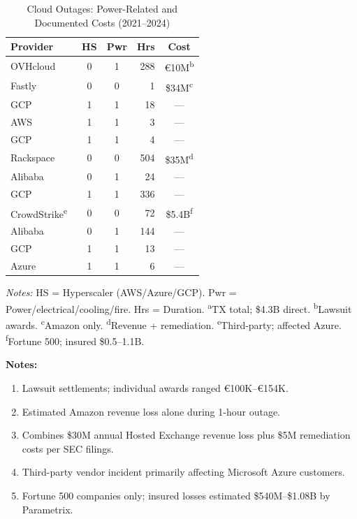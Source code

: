 \documentclass[sigconf]{acmart}
\begin{document}
\begin{table}[t]
\centering
\scriptsize
\caption{Cloud Outages: Power-Related and Documented Costs (2021--2024)}\label{tab:outages}
\begin{tabular}{@{}lccrc@{}}
\toprule
Provider & HS & Pwr & Hrs & Cost \\
\midrule
OVHcloud~\cite{uptime2021ovh} & 0 & 1 & 288 & \euro10M\textsuperscript{b} \\
Fastly~\cite{fastly2021postmortem} & 0 & 0 & 1 & \$34M\textsuperscript{c} \\
GCP~\cite{dcd2022gcplondon} & 1 & 1 & 18 & --- \\
AWS~\cite{aws2022useast2} & 1 & 1 & 3 & --- \\
GCP~\cite{dck2022gcpiowa} & 1 & 1 & 4 & --- \\
Rackspace~\cite{rackspace2023sec} & 0 & 0 & 504 & \$35M\textsuperscript{d} \\
Alibaba~\cite{scmp2022alibaba} & 0 & 1 & 24 & --- \\
GCP~\cite{register2023gcpparis} & 1 & 1 & 336 & --- \\
CrowdStrike\textsuperscript{e}~\cite{parametrix2024crowdstrike} & 0 & 0 & 72 & \$5.4B\textsuperscript{f} \\
Alibaba~\cite{dcd2024alibabafire} & 0 & 1 & 144 & --- \\
GCP~\cite{register2024gcpfrankfurt} & 1 & 1 & 13 & --- \\
Azure~\cite{statusgator2024azure} & 1 & 1 & 6 & --- \\
\bottomrule
\end{tabular}

\vspace{0.3em}
\raggedright
\tiny
\textit{Notes:} HS = Hyperscaler (AWS/Azure/GCP). Pwr = Power/electrical/cooling/fire. Hrs = Duration.
\textsuperscript{a}TX total; \$4.3B direct.
\textsuperscript{b}Lawsuit awards.
\textsuperscript{c}Amazon only.
\textsuperscript{d}Revenue + remediation.
\textsuperscript{e}Third-party; affected Azure.
\textsuperscript{f}Fortune 500; insured \$0.5--1.1B.
\end{table}

\vspace{1em}
\noindent\textbf{Notes:}
\begin{enumerate}
    \item[b.] Lawsuit settlements; individual awards ranged \euro100K--\euro154K.
    \item[c.] Estimated Amazon revenue loss alone during 1-hour outage.
    \item[d.] Combines \$30M annual Hosted Exchange revenue loss plus \$5M remediation costs per SEC filings.
    \item[e.] Third-party vendor incident primarily affecting Microsoft Azure customers.
    \item[f.] Fortune 500 companies only; insured losses estimated \$540M--\$1.08B by Parametrix.
\end{enumerate}
\end{document}
